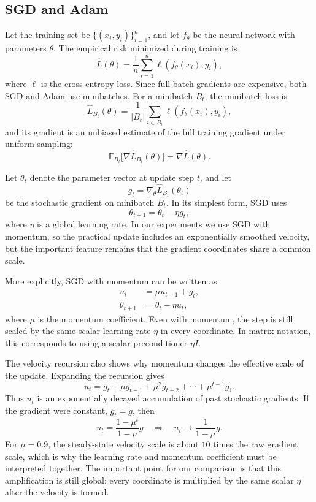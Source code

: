 \documentclass[11pt]{article}
\begin{document}
\subsection{SGD and Adam}

Let the training set be $\{(x_i,y_i)\}_{i=1}^n$, and let $f_\theta$ be the neural network with parameters $\theta$. The empirical risk minimized during training is
\[
\widehat L(\theta)
= \frac{1}{n}\sum_{i=1}^n \ell(f_\theta(x_i),y_i),
\]
where $\ell$ is the cross-entropy loss. Since full-batch gradients are expensive, both SGD and Adam use minibatches. For a minibatch $B_t$, the minibatch loss is
\[
\widehat L_{B_t}(\theta)
= \frac{1}{|B_t|}\sum_{i\in B_t}\ell(f_\theta(x_i),y_i),
\]
and its gradient is an unbiased estimate of the full training gradient under uniform sampling:
\[
\mathbb{E}_{B_t}\big[\nabla \widehat L_{B_t}(\theta)\big]
= \nabla \widehat L(\theta).
\]

Let $\theta_t$ denote the parameter vector at update step $t$, and let
\[
g_t = \nabla_\theta \widehat L_{B_t}(\theta_t)
\]
be the stochastic gradient on minibatch $B_t$. In its simplest form, SGD uses
\[
\theta_{t+1} = \theta_t - \eta g_t,
\]
where $\eta$ is a global learning rate. In our experiments we use SGD with momentum, so the practical update includes an exponentially smoothed velocity, but the important feature remains that the gradient coordinates share a common scale.

More explicitly, SGD with momentum can be written as
\begin{align}
u_t &= \mu u_{t-1} + g_t,\\
\theta_{t+1} &= \theta_t - \eta u_t,
\end{align}
where $\mu$ is the momentum coefficient. Even with momentum, the step is still scaled by the same scalar learning rate $\eta$ in every coordinate. In matrix notation, this corresponds to using a scalar preconditioner $\eta I$.

The velocity recursion also shows why momentum changes the effective scale of the update. Expanding the recursion gives
\[
u_t
= g_t+\mu g_{t-1}+\mu^2 g_{t-2}+\cdots+\mu^{t-1}g_1.
\]
Thus $u_t$ is an exponentially decayed accumulation of past stochastic gradients. If the gradient were constant, $g_t=g$, then
\[
u_t
= \frac{1-\mu^t}{1-\mu}g
\quad\Longrightarrow\quad
u_t\to \frac{1}{1-\mu}g.
\]
For $\mu=0.9$, the steady-state velocity scale is about $10$ times the raw gradient scale, which is why the learning rate and momentum coefficient must be interpreted together. The important point for our comparison is that this amplification is still global: every coordinate is multiplied by the same scalar $\eta$ after the velocity is formed.
\end{document}
